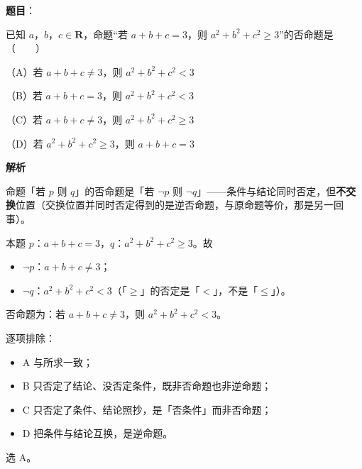 \begin{answer}

\textbf{题目}：

已知 $a$，$b$，$c\in\mathbf R$，命题“若 $a+b+c=3$，则 $a^2+b^2+c^2\geqslant 3$”的否命题是\mbox{（　　）}

（A）若 $a+b+c\neq 3$，则 $a^2+b^2+c^2<3$

（B）若 $a+b+c=3$，则 $a^2+b^2+c^2<3$

（C）若 $a+b+c\neq 3$，则 $a^2+b^2+c^2\geqslant 3$

（D）若 $a^2+b^2+c^2\geqslant 3$，则 $a+b+c=3$

\textbf{解析}

命题「若 $p$ 则 $q$」的否命题是「若 $\lnot p$ 则 $\lnot q$」——条件与结论同时否定，但\textbf{不交换}位置（交换位置并同时否定得到的是逆否命题，与原命题等价，那是另一回事）。

本题 $p$：$a+b+c=3$，$q$：$a^2+b^2+c^2\geqslant3$。故

\begin{itemize}
\item $\lnot p$：$a+b+c\neq3$；
\item $\lnot q$：$a^2+b^2+c^2<3$（「$\geqslant$」的否定是「$<$」，不是「$\leqslant$」）。
\end{itemize}

否命题为：若 $a+b+c\neq3$，则 $a^2+b^2+c^2<3$。

逐项排除：

\begin{itemize}
\item A 与所求一致；
\item B 只否定了结论、没否定条件，既非否命题也非逆命题；
\item C 只否定了条件、结论照抄，是「否条件」而非否命题；
\item D 把条件与结论互换，是逆命题。
\end{itemize}

选 A。


\end{answer}
